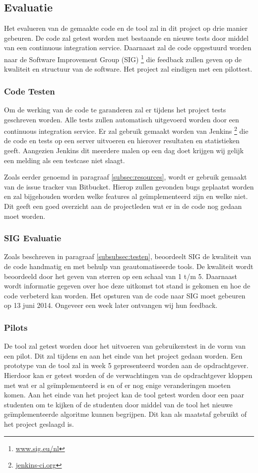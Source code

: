\subsection{Evaluatie}
Het evalueren van de gemaakte code en de tool zal in dit project op drie manier gebeuren. De code zal getest worden met bestaande en nieuwe tests door middel van een continuous integration service. Daarnaast zal de code opgestuurd worden naar de Software Improvement Group (SIG) \footnote{\href{http://www.sig.eu/nl}{www.sig.eu/nl}} die feedback zullen geven op de kwaliteit en structuur van de software. Het project zal eindigen met een pilottest.

\subsubsection{Code Testen}
Om de werking van de code te garanderen zal er tijdens het project tests geschreven worden. Alle tests zullen automatisch uitgevoerd worden door een continuous integration service. Er zal gebruik gemaakt worden van Jenkins \footnote{\href{http://jenkins-ci.org}{jenkins-ci.org}} die de code en tests op een server uitvoeren en hierover resultaten en statistieken geeft. Aangezien Jenkins dit meerdere malen op een dag doet krijgen wij gelijk een melding als een testcase niet slaagt.

Zoals eerder genoemd in paragraaf \ref{subsec:resources}, wordt er gebruik gemaakt van de issue tracker van Bitbucket. Hierop zullen gevonden bugs geplaatst worden en zal bijgehouden worden welke features al ge\"implementeerd zijn en welke niet. Dit geeft een goed overzicht aan de projectleden wat er in de code nog gedaan moet worden.

\subsubsection{SIG Evaluatie}
Zoals beschreven in paragraaf \ref{subsubsec:testen}, beoordeelt SIG de kwaliteit van de code handmatig en met behulp van geautomatiseerde tools. De kwaliteit wordt beoordeeld door het geven van sterren op een schaal van 1 t/m 5. Daarnaast wordt informatie gegeven over hoe deze uitkomst tot stand is gekomen en hoe de code verbeterd kan worden. Het opsturen van de code naar SIG moet gebeuren op 13 juni 2014. Ongeveer een week later ontvangen wij hun feedback.

\subsubsection{Pilots}
De tool zal getest worden door het uitvoeren van gebruikerstest in de vorm van een pilot. Dit zal tijdens en aan het einde van het project gedaan worden. Een prototype van de tool zal in week 5 gepresenteerd worden aan de opdrachtgever. Hierdoor kan er getest worden of de verwachtingen van de opdrachtgever kloppen met wat er al ge\"implementeerd is en of er nog enige veranderingen moeten komen. Aan het einde van het project kan de tool getest worden door een paar studenten om te kijken of de studenten door middel van de tool het nieuwe ge\"implementeerde algoritme kunnen begrijpen. Dit kan als maatstaf gebruikt of het project geslaagd is.

